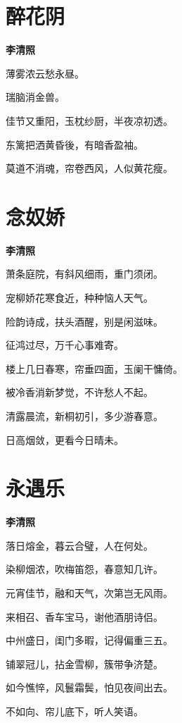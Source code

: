 \documentclass[12pt,a4paper]{ctexbook}
\begin{document}
\section{醉花阴}
\textbf{李清照}\par\vspace{0.5em}
薄雾浓云愁永昼。\par
瑞脑消金兽。\par
佳节又重阳，玉枕纱厨，半夜凉初透。\par
东篱把洒黄昏後，有暗香盈袖。\par
莫道不消魂，帘卷西风，人似黄花瘦。\par

\section{念奴娇}
\textbf{李清照}\par\vspace{0.5em}
萧条庭院，有斜风细雨，重门须闭。\par
宠柳娇花寒食近，种种恼人天气。\par
险韵诗成，扶头酒醒，别是闲滋味。\par
征鸿过尽，万千心事难寄。\par
楼上几日春寒，帘垂四面，玉阑干慵倚。\par
被冷香消新梦觉，不许愁人不起。\par
清露晨流，新桐初引，多少游春意。\par
日高烟敛，更看今日晴未。\par

\section{永遇乐}
\textbf{李清照}\par\vspace{0.5em}
落日熔金，暮云合璧，人在何处。\par
染柳烟浓，吹梅笛怨，春意知几许。\par
元宵佳节，融和天气，次第岂无风雨。\par
来相召、香车宝马，谢他酒朋诗侣。\par
中州盛日，闺门多暇，记得偏重三五。\par
铺翠冠儿，拈金雪柳，簇带争济楚。\par
如今憔悴，风鬟霜鬓，怕见夜间出去。\par
不如向、帘儿底下，听人笑语。\par
\end{document}
